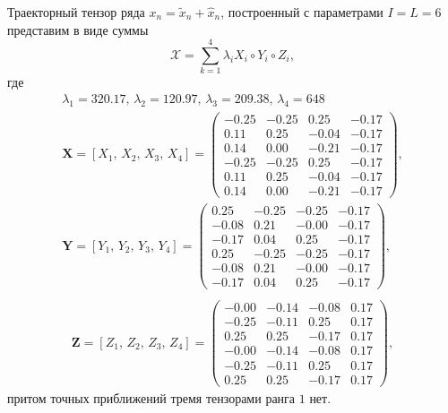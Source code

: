 \documentclass[specialist,
    substylefile = spbu_report.rtx,
    subf,href,colorlinks=true, 12pt]{disser}
\theoremstyle{plain}
\theoremstyle{definition}
\theoremstyle{remark}
\begin{document}
    Траекторный тензор ряда $x_n=\tilde{x}_n+\hat{x}_n$, построенный с параметрами $I=L=6$ представим в виде суммы
    \[
        \mathcal{X}=\sum_{k=1}^{4}\lambda_i X_i \circ Y_i\circ Z_i,
    \]
    где
    \begin{gather*}
        \lambda_1 =320.17,\, \lambda_2 =120.97,\, \lambda_3 =209.38,\, \lambda_4=648\\
        \mathbf{X}=[X_1,\, X_2,\, X_3,\, X_4] =
        \begin{pmatrix}
            -0.25 & -0.25 & 0.25  & -0.17 \\
            0.11  & 0.25  & -0.04 & -0.17 \\
            0.14  & 0.00  & -0.21 & -0.17 \\
            -0.25 & -0.25 & 0.25  & -0.17 \\
            0.11  & 0.25  & -0.04 & -0.17 \\
            0.14  & 0.00  & -0.21 & -0.17
        \end{pmatrix},\\
        \mathbf{Y}=[Y_1,\, Y_2,\, Y_3,\, Y_4] =
        \begin{pmatrix}
            0.25  & -0.25 & -0.25 & -0.17 \\
            -0.08 & 0.21  & -0.00 & -0.17 \\
            -0.17 & 0.04  & 0.25  & -0.17 \\
            0.25  & -0.25 & -0.25 & -0.17 \\
            -0.08 & 0.21  & -0.00 & -0.17 \\
            -0.17 & 0.04  & 0.25  & -0.17
        \end{pmatrix},\\
    \end{gather*}
    \begin{gather*}
        \mathbf{Z}=[Z_1,\, Z_2,\, Z_3,\, Z_4] =
        \begin{pmatrix}
            -0.00 & -0.14 & -0.08 & 0.17 \\
            -0.25 & -0.11 & 0.25  & 0.17 \\
            0.25  & 0.25  & -0.17 & 0.17 \\
            -0.00 & -0.14 & -0.08 & 0.17 \\
            -0.25 & -0.11 & 0.25  & 0.17 \\
            0.25  & 0.25  & -0.17 & 0.17
        \end{pmatrix},
    \end{gather*}
    притом точных приближений тремя тензорами ранга $1$ нет.
\end{document}
